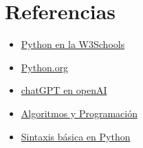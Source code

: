 \section{Referencias}

\begin{itemize}
\tightlist
\item
  \href{https://www.w3schools.com/python/}{Python en la W3Schools}
\item
  \href{https://www.python.org/}{Python.org}
\item
  \href{https://chatgpt.com/}{chatGPT en openAI}
\item
  \href{https://lab.anahuac.mx/~hselley/ayp/conceptosBasicos.html}{Algoritmos
  y Programación}
\item
  \href{https://lab.anahuac.mx/~hselley/mn/python.html}{Sintaxis básica
  en Python}
\end{itemize}
